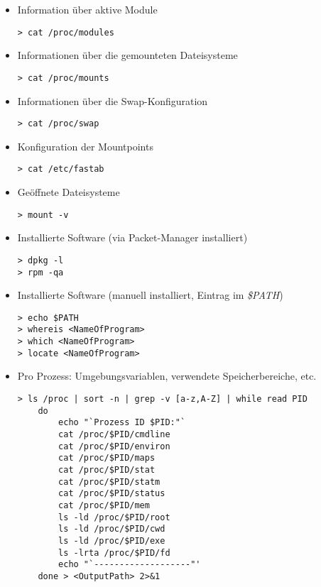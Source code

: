 \begin{itemize}
\item  Information über aktive Module
\begin{lstlisting}
> cat /proc/modules
\end{lstlisting}

\item  Informationen über die gemounteten Dateisysteme
\begin{lstlisting}
> cat /proc/mounts
\end{lstlisting}

\item  Informationen über die Swap-Konfiguration
\begin{lstlisting}
> cat /proc/swap
\end{lstlisting}

\item  Konfiguration der Mountpoints
\begin{lstlisting}
> cat /etc/fastab
\end{lstlisting}

\item Geöffnete Dateisysteme
\begin{lstlisting}
> mount -v
\end{lstlisting}

\item Installierte Software (via Packet-Manager installiert)
\begin{lstlisting}
> dpkg -l
> rpm -qa
\end{lstlisting}

\item Installierte Software (manuell installiert, Eintrag im \textit{\$PATH})
\begin{lstlisting}
> echo $PATH
> whereis <NameOfProgram>
> which <NameOfProgram>
> locate <NameOfProgram>
\end{lstlisting}


\item  Pro Prozess: Umgebungsvariablen, verwendete Speicherbereiche, etc.
\begin{lstlisting}
> ls /proc | sort -n | grep -v [a-z,A-Z] | while read PID
	do
		echo "`Prozess ID $PID:"`
		cat /proc/$PID/cmdline
		cat /proc/$PID/environ
		cat /proc/$PID/maps
		cat /proc/$PID/stat
		cat /proc/$PID/statm
		cat /proc/$PID/status
		cat /proc/$PID/mem
		ls -ld /proc/$PID/root
		ls -ld /proc/$PID/cwd
		ls -ld /proc/$PID/exe
		ls -lrta /proc/$PID/fd
		echo "`-------------------"'
	done > <OutputPath> 2>&1
\end{lstlisting}
\end{itemize}





